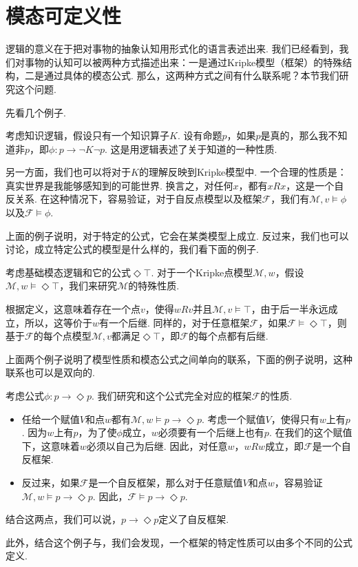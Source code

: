 \section{模态可定义性}\label{sec:modal-definability}

逻辑的意义在于把对事物的抽象认知用形式化的语言表述出来. 我们已经看到，我们对事物的认知可以被两种方式描述出来：一是通过Kripke模型（框架）的特殊结构，二是通过具体的模态公式. 那么，这两种方式之间有什么联系呢？本节我们研究这个问题. 

先看几个例子. 
\begin{example}
考虑知识逻辑，假设只有一个知识算子$K$. 设有命题$p$，如果$p$是真的，那么我不知道非$p$，即$\phi: p \to \neg K \neg p$. 这是用逻辑表述了关于知道的一种性质. 

另一方面，我们也可以将对于$K$的理解反映到Kripke模型中. 一个合理的性质是：真实世界是我能够感知到的可能世界. 换言之，对任何$x$，都有$xRx$，这是一个自反关系. 在这种情况下，容易验证，对于自反点模型以及框架$\mathcal{F}$，我们有$\mathcal{M}, v \vDash \phi$以及$\mathcal{F} \vDash \phi$. 
\end{example}

上面的例子说明，对于特定的公式，它会在某类模型上成立. 反过来，我们也可以讨论，成立特定公式的模型是什么样的，我们看下面的例子. 

\begin{example}\label{example:box-top}
考虑基础模态逻辑和它的公式$\Diamond \top$. 对于一个Kripke点模型$\mathcal{M},w$，假设$\mathcal{M}, w \vDash \Diamond \top$，我们来研究$\mathcal{M}$的特殊性质. 

根据定义，这意味着存在一个点$v$，使得$w R v$并且$\mathcal{M}, v \vDash \top$，由于后一半永远成立，所以，这等价于$w$有一个后继. 同样的，对于任意框架$\mathcal{F}$，如果$\mathcal{F} \vDash \Diamond \top$，则基于$\mathcal{F}$的每个点模型$\mathcal{M}, v$都满足$\Diamond \top$，即$\mathcal{F}$的每个点都有后继. 
\end{example}

上面两个例子说明了模型性质和模态公式之间单向的联系，下面的例子说明，这种联系也可以是双向的. 

\begin{example}
考虑公式$\phi:p \to \Diamond p$. 我们研究和这个公式完全对应的框架$\mathcal{F}$的性质. 
\begin{itemize}
    \item 任给一个赋值$V$和点$w$都有$\mathcal{M}, w \vDash p \to \Diamond p$. 考虑一个赋值$V$，使得只有$w$上有$p$. 因为$w$上有$p$，为了使$\phi$成立，$w$必须要有一个后继上也有$p$. 在我们的这个赋值下，这意味着$w$必须以自己为后继. 因此，对任意$w$，$wRw$成立，即$\mathcal{F}$是一个自反框架. 
    \item 反过来，如果$\mathcal{F}$是一个自反框架，那么对于任意赋值$V$和点$w$，容易验证$\mathcal{M}, w \vDash p \to \Diamond p$. 因此，$\mathcal{F} \vDash p \to \Diamond p$. 
\end{itemize}
结合这两点，我们可以说，$p\to \Diamond p$定义了自反框架. 

此外，结合这个例子与，我们会发现，一个框架的特定性质可以由多个不同的公式定义. 
\end{example}

